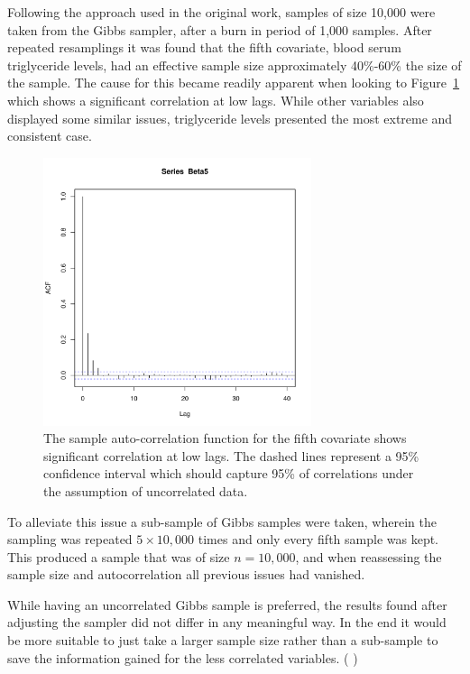 \documentclass{uwstat572}
\newcommand{\vmcomment}[1]{({\color{blue}{VM's comment:}} \textbf{\color{blue}{#1}})}
\begin{document}
Following the approach used in the original work, samples of size 10,000 were taken from the Gibbs sampler, after a burn in period of 1,000 samples. After repeated resamplings it was found that the fifth covariate, blood serum triglyceride levels, had an effective sample size approximately 40\%-60\% the size of the sample. The cause for this became readily apparent when looking to Figure~\ref{Var5} which shows a significant correlation at low lags. While other variables also displayed some similar issues, triglyceride levels presented the most extreme and consistent case.

\begin{figure}\label{Var5}
  \centering
    \includegraphics[width=0.7\textwidth]{Beta5ACFunsub.pdf}
  \caption{The sample auto-correlation function for the fifth covariate shows significant correlation at low lags. The dashed lines represent a 95\% confidence interval which should capture 95\% of correlations under the assumption of uncorrelated data.}
\end{figure}

To alleviate this issue a sub-sample of Gibbs samples were taken, wherein the sampling was repeated $5 \times 10,000$ times and only every fifth sample was kept. This produced a sample that was of size $n=10,000$, and when reassessing the sample size and autocorrelation all previous issues had vanished.

While having an uncorrelated Gibbs sample is preferred, the results found after adjusting the sampler did not differ in any meaningful way. In the end it would be more suitable to just take a larger sample size rather than a sub-sample to save the information gained for the less correlated variables.
\vmcomment{Also, auto-correlation is not the enemy, really. Only if the ESSs are ridiculously small, which is a problem for constructing credible intervals.}
\end{document}
